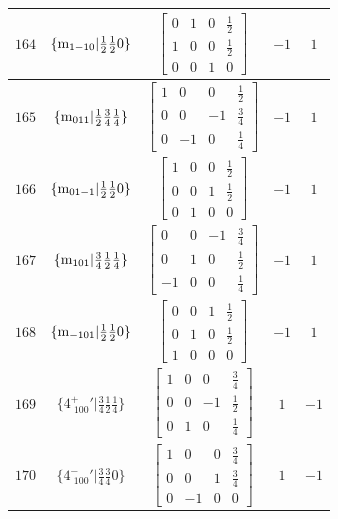 \documentclass[fleqn,8pt]{jsarticle}
\begin{document}
\begin{longtable}{ccccc}
$ 164 $ & $ \{{\rm m}_{1-10}|\frac{1}{2} \frac{1}{2} 0\} $ & $ \begin{bmatrix} 0 & 1 & 0 & \frac{1}{2} \\ 1 & 0 & 0 & \frac{1}{2} \\ 0 & 0 & 1 & 0 \end{bmatrix} $ & $ -1 $ & $ 1 $ \\ \hline
$ 165 $ & $ \{{\rm m}_{011}|\frac{1}{2} \frac{3}{4} \frac{1}{4}\} $ & $ \begin{bmatrix} 1 & 0 & 0 & \frac{1}{2} \\ 0 & 0 & -1 & \frac{3}{4} \\ 0 & -1 & 0 & \frac{1}{4} \end{bmatrix} $ & $ -1 $ & $ 1 $ \\ \hline
$ 166 $ & $ \{{\rm m}_{01-1}|\frac{1}{2} \frac{1}{2} 0\} $ & $ \begin{bmatrix} 1 & 0 & 0 & \frac{1}{2} \\ 0 & 0 & 1 & \frac{1}{2} \\ 0 & 1 & 0 & 0 \end{bmatrix} $ & $ -1 $ & $ 1 $ \\ \hline
$ 167 $ & $ \{{\rm m}_{101}|\frac{3}{4} \frac{1}{2} \frac{1}{4}\} $ & $ \begin{bmatrix} 0 & 0 & -1 & \frac{3}{4} \\ 0 & 1 & 0 & \frac{1}{2} \\ -1 & 0 & 0 & \frac{1}{4} \end{bmatrix} $ & $ -1 $ & $ 1 $ \\ \hline
$ 168 $ & $ \{{\rm m}_{-101}|\frac{1}{2} \frac{1}{2} 0\} $ & $ \begin{bmatrix} 0 & 0 & 1 & \frac{1}{2} \\ 0 & 1 & 0 & \frac{1}{2} \\ 1 & 0 & 0 & 0 \end{bmatrix} $ & $ -1 $ & $ 1 $ \\ \hline
$ 169 $ & $ \{4^{+}_{\,\,100}{}'|\frac{3}{4} \frac{1}{2} \frac{1}{4}\} $ & $ \begin{bmatrix} 1 & 0 & 0 & \frac{3}{4} \\ 0 & 0 & -1 & \frac{1}{2} \\ 0 & 1 & 0 & \frac{1}{4} \end{bmatrix} $ & $ 1 $ & $ -1 $ \\ \hline
$ 170 $ & $ \{4^{-}_{\,\,100}{}'|\frac{3}{4} \frac{3}{4} 0\} $ & $ \begin{bmatrix} 1 & 0 & 0 & \frac{3}{4} \\ 0 & 0 & 1 & \frac{3}{4} \\ 0 & -1 & 0 & 0 \end{bmatrix} $ & $ 1 $ & $ -1 $ \\ \hline

\end{longtable}
\end{document}
